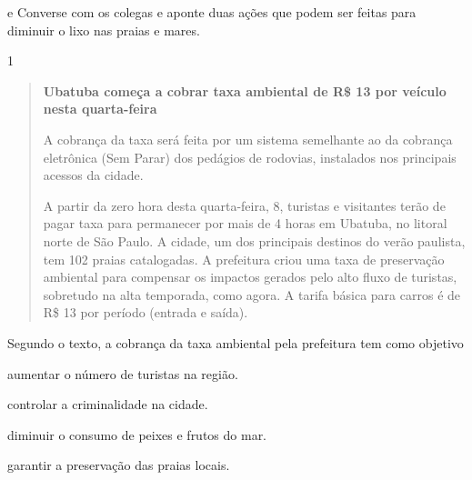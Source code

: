 
\num{e} Converse com os colegas e aponte duas ações que podem ser feitas para
diminuir o lixo nas praias e mares.



\num{1}

\begin{quote}
\textbf{Ubatuba começa a cobrar taxa ambiental de R\$ 13 por veículo
nesta quarta-feira}

A cobrança da taxa será feita por um sistema semelhante ao da cobrança
eletrônica (Sem Parar) dos pedágios de rodovias, instalados nos
principais acessos da cidade.

A partir da zero hora desta quarta-feira, 8, turistas e visitantes terão
de pagar taxa para permanecer por mais de 4 horas em Ubatuba, no litoral
norte de São Paulo. A cidade, um dos principais destinos do verão
paulista, tem 102 praias catalogadas. A prefeitura criou uma taxa de
preservação ambiental para compensar os impactos gerados pelo alto fluxo
de turistas, sobretudo na alta temporada, como agora. A tarifa básica
para carros é de R\$ 13 por período (entrada e saída).

\end{quote}

Segundo o texto, a cobrança da taxa ambiental pela prefeitura tem como
objetivo

\begin{escolha}
\item aumentar o número de turistas na região.

\item controlar a criminalidade na cidade.

\item diminuir o consumo de peixes e frutos do mar.

\item garantir a preservação das praias locais.
\end{escolha}


